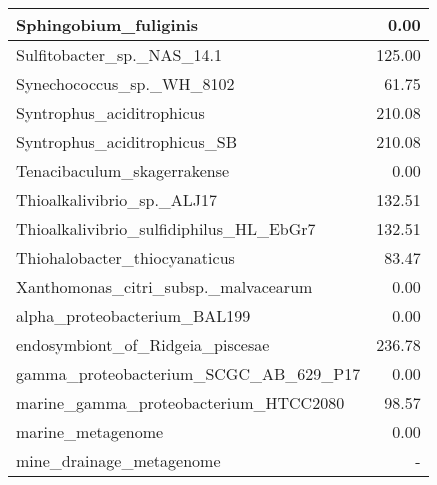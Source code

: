 \documentclass[12pt,a4paper]{article}
\begin{document}
\begin{table}[ht]
\begin{center}
\begin{tabular}{|l*{1}{|r}|}
Sphingobium\_fuliginis & 0.00 \\ \hline
Sulfitobacter\_sp.\_NAS\_14.1 & 125.00 \\ \hline
Synechococcus\_sp.\_WH\_8102 & 61.75 \\ \hline
Syntrophus\_aciditrophicus & 210.08 \\ \hline
Syntrophus\_aciditrophicus\_SB & 210.08 \\ \hline
Tenacibaculum\_skagerrakense & 0.00 \\ \hline
Thioalkalivibrio\_sp.\_ALJ17 & 132.51 \\ \hline
Thioalkalivibrio\_sulfidiphilus\_HL\_EbGr7 & 132.51 \\ \hline
Thiohalobacter\_thiocyanaticus & 83.47 \\ \hline
Xanthomonas\_citri\_subsp.\_malvacearum & 0.00 \\ \hline
alpha\_proteobacterium\_BAL199 & 0.00 \\ \hline
endosymbiont\_of\_Ridgeia\_piscesae & 236.78 \\ \hline
gamma\_proteobacterium\_SCGC\_AB\_629\_P17 & 0.00 \\ \hline
marine\_gamma\_proteobacterium\_HTCC2080 & 98.57 \\ \hline
marine\_metagenome & 0.00 \\ \hline
mine\_drainage\_metagenome & - \\ \hline
\end{tabular}
\end{center}
\end{table}
\end{document}

